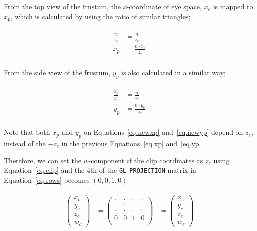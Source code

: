 From the top view of the frustum, the $x$-coordinate of eye space, $x_e$ is mapped to $x_p$, which is calculated by using the ratio of similar triangles; 

\begin{equation}
\begin{aligned}
\begin{split}
\frac{x_p}{x_e}&=\frac{n}{z_e}\\
x_p&=\frac{n \cdot x_e}{z_e}\\
\end{split}
\end{aligned}
\label{eq.newxp}
\end{equation}

From the side view of the frustum, $y_p$ is also calculated in a similar way; 

\begin{equation}
\begin{aligned}
\begin{split}
\frac{y_p}{y_e}&=\frac{n}{z_e}\\
y_p&=\frac{n \cdot y_e}{z_e}\\
\end{split}
\end{aligned}
\label{eq.newyp}
\end{equation}

Note that both $x_p$ and $y_p$ on Equations~\ref{eq.newxp} and~\ref{eq.newyp} depend on $z_e$, instead of the $-z_e$ in the previous Equations~\ref{eq.xp} and~\ref{eq.yp}.

Therefore, we can set the $w$-component of the clip coordinates as $z_e$ using Equation~\ref{eq.clip} and the 4th of the \verb|GL_PROJECTION| matrix in Equation~\ref{eq.rows} becomes $(0, 0, 1, 0)$;

\begin{equation}
\begin{aligned}
\begin{split}
\begin{pmatrix} x_{c}\\y_{c}\\z_{c}\\w_{c} \end{pmatrix} &= 
\begin{pmatrix} 
\cdot & \cdot & \cdot & \cdot \\
\cdot & \cdot & \cdot & \cdot \\
\cdot & \cdot & \cdot & \cdot \\
0 & 0 & 1 & 0 \\
\end{pmatrix} &=
\begin{pmatrix} x_{e}\\y_{e}\\z_{e}\\w_{e} \end{pmatrix}
\end{split}
\end{aligned}
\label{eq.newrows}
\end{equation}

